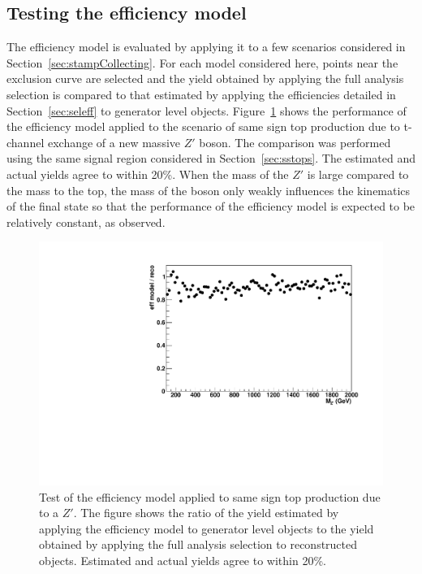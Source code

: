 \subsection{Testing the efficiency model}
\label{sec:outreachtest}

The efficiency model is evaluated by applying it to a few scenarios considered in Section~\ref{sec:stampCollecting}.  For each model considered here, points near the exclusion curve are selected and the yield obtained by applying the full analysis selection is compared to that estimated by applying the efficiencies detailed in Section~\ref{sec:seleff} to generator level objects.  Figure~\ref{fig:zprimeefftest} shows the performance of the efficiency model applied to the scenario of same sign top production due to t-channel exchange of a new massive $Z'$ boson.  The comparison was performed using the same signal region considered in Section~\ref{sec:sstops}.  The estimated and actual yields agree to within 20\%.  When the mass of the $Z'$ is large compared to the mass to the top, the mass of the boson only weakly influences the kinematics of the final state so that the performance of the efficiency model is expected to be relatively constant, as observed.

\begin{figure}[htb]
\begin{center}
\includegraphics[width=0.95\linewidth]{figs/zprime_eff_test.pdf}
\caption{Test of the efficiency model applied to same sign top production due to a $Z'$.  The figure shows the ratio of the yield estimated by applying the efficiency model to generator level objects to the yield obtained by applying the full analysis selection to reconstructed objects.  Estimated and actual yields agree to within 20\%.
\label{fig:zprimeefftest}}
\end{center}
\end{figure}

